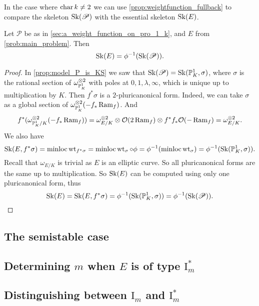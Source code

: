 In the case where $\operatorname{char} k \ne 2$ we can use \cref{prop:weightfunction_fullback} to compare the skeleton $\operatorname{Sk}(\mathscr P)$ with the essential skeleton $\operatorname{Sk}(E)$. 
\begin{lemma}\label{lem:sk_E_pulls_back}
	Let $\mathscr P$ be as in \cref{sec:a_weight_function_on_pro_1_k}, and $E$ from \cref{prob:main_problem}. 
	Then \[
		\sk(E) = \phi^{-1}(\sk(\mathscr P))
	.\] 
\end{lemma}
\begin{proof}
	In \cref{prop:model_P_is_KS} we saw that $\operatorname{Sk}(\mathscr P) = \operatorname{Sk}(\mathbb{P}^{1}_K, \sigma)$, where $\sigma$ is the rational section of $\omega_{\mathbb{P}^{1}_K}^{\otimes 2}$ with poles at $0, 1, \lambda, \infty$, which is unique up to multiplication by $K$. 
	Then $f^* \sigma$ is a $2$-pluricanonical form. 
	Indeed, we can take $\sigma$ as a global section of $\omega_{\mathbb{P}^{1}_K}^{\otimes 2}(-f_* \operatorname{Ram} _f)$. 
	And 
	\[
		f^* (\omega_{\mathbb{P}^{1}_K / K}^{\otimes 2}(-f_* \operatorname{Ram} _f)) = \omega_{E /K}^{\otimes 2} \otimes \mathcal{O}(2 \operatorname{Ram}_f) \otimes f^*f_* \mathcal{O}(-\operatorname{Ram} _f) = \omega_{E / K}^{\otimes 2}
	.\] 
	We also have 
	\[
		\sk(E, f^*\sigma) = \minloc \wt_{f^* \sigma} = \minloc \wt_{\sigma}\circ \phi = \phi^{-1}(\minloc \wt_\sigma) = \phi^{-1} (\sk(\pro^{1}_K, \sigma))
	.\] 
	Recall that $\omega_{E / K}$ is trivial as $E$ is an elliptic curve. 
	So all pluricanonical forms are the same up to multiplication. 
	So $\operatorname{Sk}(E)$ can be computed using only one pluricanonical form, thus \[
		\sk(E) = \sk(E, f^*\sigma) = \phi^{-1}(\sk(\pro^{1}_K, \sigma)) = \phi^{-1}(\sk(\mathscr P))
	.\] 
\end{proof}

\subsection{The semistable case} \label{sec:the_semistable_case}


\subsection{Determining $m$ when $E$ is of type $\mathrm I_m^*$} \label{sec:determining_m_when_e_is_of_type_ims}


\subsection{Distinguishing between $\mathrm I_m$ and  $\mathrm I_m^*$} \label{sec:distinguishing_between_im_and_ims}

